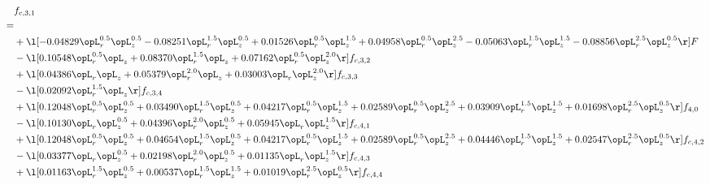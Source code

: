 \begin{alignat}{2} 
\label{eq:f_31_2} 
& f_{c,3,1} \nonumber \\ 
 = \\ 
& + \l[  -0.04829 \opL_r^{0.5} \opL_z^{0.5}   -0.08251 \opL_r^{1.5} \opL_z^{0.5} +  0.01526 \opL_r^{0.5} \opL_z^{1.5} +  0.04958 \opL_r^{0.5} \opL_z^{2.5}   -0.05063 \opL_r^{1.5} \opL_z^{1.5}   -0.08856 \opL_r^{2.5} \opL_z^{0.5}  \r] F \nonumber \\ 
& - \l[  0.10548 \opL_r^{0.5} \opL_z +  0.08370 \opL_r^{1.5} \opL_z +  0.07162 \opL_r^{0.5} \opL_z^{2.0}  \r] f_{c,3,2} \nonumber \\ 
& + \l[  0.04386 \opL_r \opL_z +  0.05379 \opL_r^{2.0} \opL_z +  0.03003 \opL_r \opL_z^{2.0}  \r] f_{c,3,3} \nonumber \\ 
& - \l[  0.02092 \opL_r^{1.5} \opL_z  \r] f_{c,3,4} \nonumber \\ 
& + \l[  0.12048 \opL_r^{0.5} \opL_z^{0.5} +  0.03490 \opL_r^{1.5} \opL_z^{0.5} +  0.04217 \opL_r^{0.5} \opL_z^{1.5} +  0.02589 \opL_r^{0.5} \opL_z^{2.5} +  0.03909 \opL_r^{1.5} \opL_z^{1.5} +  0.01698 \opL_r^{2.5} \opL_z^{0.5}  \r] f_{4,0} \nonumber \\ 
& - \l[  0.10130 \opL_r \opL_z^{0.5} +  0.04396 \opL_r^{2.0} \opL_z^{0.5} +  0.05945 \opL_r \opL_z^{1.5}  \r] f_{c,4,1} \nonumber \\ 
& + \l[  0.12048 \opL_r^{0.5} \opL_z^{0.5} +  0.04654 \opL_r^{1.5} \opL_z^{0.5} +  0.04217 \opL_r^{0.5} \opL_z^{1.5} +  0.02589 \opL_r^{0.5} \opL_z^{2.5} +  0.04446 \opL_r^{1.5} \opL_z^{1.5} +  0.02547 \opL_r^{2.5} \opL_z^{0.5}  \r] f_{c,4,2} \nonumber \\ 
& - \l[  0.03377 \opL_r \opL_z^{0.5} +  0.02198 \opL_r^{2.0} \opL_z^{0.5} +  0.01135 \opL_r \opL_z^{1.5}  \r] f_{c,4,3} \nonumber \\ 
& + \l[  0.01163 \opL_r^{1.5} \opL_z^{0.5} +  0.00537 \opL_r^{1.5} \opL_z^{1.5} +  0.01019 \opL_r^{2.5} \opL_z^{0.5}  \r] f_{c,4,4} \nonumber \\ 
\end{alignat} 


